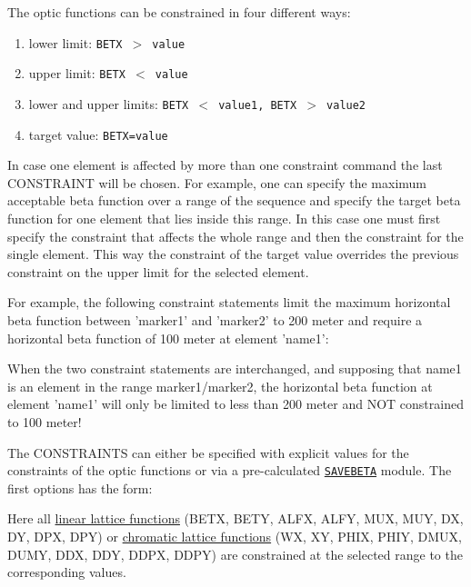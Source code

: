 The optic functions can be constrained in four different ways: 
\begin{enumerate}
 \item lower limit: \texttt{BETX $>$ value}
 \item upper limit: \texttt{BETX $<$ value}
 \item lower and upper limits: \texttt{BETX $<$ value1, 
   BETX $>$ value2} 
 \item target value: \texttt{BETX=value}
\end{enumerate} 

In case one element is affected by more than one constraint command the
last CONSTRAINT will be chosen. For example, one can specify the
maximum acceptable beta function over a range of the sequence and
specify the target beta function for one element that lies inside this
range. In this case one must first specify the constraint that affects
the whole range and then the constraint for the single element. This way
the constraint of the target value overrides the previous constraint on
the upper limit for the selected element. 

For example, the following
constraint statements limit the maximum horizontal beta function between
'marker1' and 'marker2' to 200 meter and require a horizontal beta
function of 100 meter at element 'name1':  

When the two constraint statements are interchanged, and supposing that
name1 is an element in the range marker1/marker2, the horizontal beta 
function at element 'name1' will only be limited to less than 200 meter
and NOT constrained to 100 meter! 

The CONSTRAINTS can either be specified with explicit values for the
constraints of the optic functions or via a pre-calculated
\hyperref[sec:savebeta]{\texttt{SAVEBETA}} module. The first
options has the form: 

Here all \hyperref[subsec:tables-linear]{linear lattice functions} 
(BETX, BETY, ALFX, ALFY, MUX, MUY, DX, DY, DPX, DPY)
or \hyperref[subsec:tables-chrom]{chromatic lattice functions}
(WX, XY, PHIX, PHIY, DMUX, DUMY, DDX, DDY, DDPX, DDPY)
are constrained at the selected range to the corresponding values.

